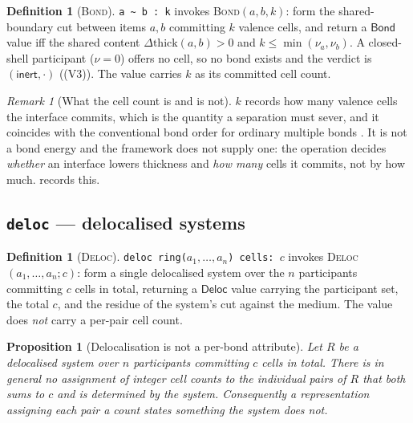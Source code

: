 \documentclass[11pt,twocolumn,a4paper]{article}
\theoremstyle{thmstyle}
\newtheorem{proposition}[theorem]{Proposition}
\theoremstyle{definition}
\newtheorem{definition}[theorem]{Definition}
\theoremstyle{remark}
\newtheorem{remark}[theorem]{Remark}
\newcommand{\hj}[1]{\texttt{#1}}
\begin{document}
\begin{definition}[\textsc{Bond}]
\label{def:bond}
\hj{a \~{} b : k} invokes \textsc{Bond}$(a,b,k)$: form the shared-boundary
cut between items $a,b$ committing $k$ valence cells, and return a
$\mathsf{Bond}$ value iff the shared content $\Delta\mathrm{thick}(a,b)>0$
and $k\le\min(\nu_a,\nu_b)$. A closed-shell participant ($\nu=0$) offers
no cell, so no bond exists and the verdict is $(\textsf{inert},\cdot)$
((V3)). The value carries $k$ as its committed
cell count.
\end{definition}

\begin{remark}[What the cell count is and is not]
\label{rem:cells-scope}
$k$ records how many valence cells the interface commits, which is the
quantity a separation must sever, and it coincides with the conventional
bond order for ordinary multiple bonds \citep{lewis1916}. It is not a
bond energy and the framework does not supply one: the operation decides
\emph{whether} an interface lowers thickness and \emph{how many} cells it
commits, not by how much.  records this.
\end{remark}

\subsection{\texorpdfstring{\hj{deloc} --- delocalised systems}{deloc --- delocalised systems}}
\label{sec:stdlib-deloc}

\begin{definition}[\textsc{Deloc}]
\label{def:deloc}
\hj{deloc ring($a_1,\dots,a_n$) cells: $c$} invokes
\textsc{Deloc}$(a_1,\dots,a_n;c)$: form a single delocalised system over
the $n$ participants committing $c$ cells in total, returning a
$\mathsf{Deloc}$ value carrying the participant set, the total $c$, and
the residue of the system's cut against the medium. The value does
\emph{not} carry a per-pair cell count.
\end{definition}

\begin{proposition}[Delocalisation is not a per-bond attribute]
\label{prop:deloc}
Let $R$ be a delocalised system over $n$ participants committing $c$ cells
in total. There is in general no assignment of integer cell counts to the
individual pairs of $R$ that both sums to $c$ and is determined by the
system. Consequently a representation assigning each pair a count states
something the system does not.
\end{proposition}
\end{document}
